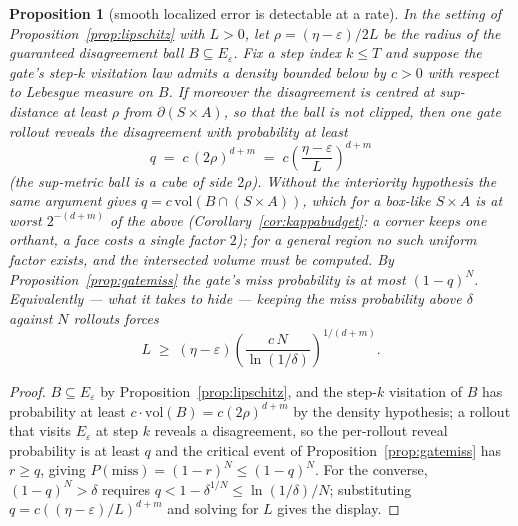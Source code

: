 \documentclass[11pt]{article}
\newtheorem{proposition}{Proposition}
\theoremstyle{definition}
\theoremstyle{remark}
\begin{document}
\begin{proposition}[smooth localized error is detectable at a rate]
\label{prop:detectrate}
In the setting of Proposition~\ref{prop:lipschitz} with $L > 0$, let $\rho = (\eta-\varepsilon)/2L$ be the radius of the guaranteed disagreement ball $B \subseteq E_\varepsilon$. Fix a step index $k \leq T$ and suppose the gate's step-$k$ visitation law admits a density bounded below by $c > 0$ with respect to Lebesgue measure on $B$. If moreover the disagreement is centred at sup-distance at least $\rho$ from $\partial(S \times A)$, so that the ball is not clipped, then one gate rollout reveals the disagreement with probability at least
\[
  q \;=\; c\,(2\rho)^{d+m} \;=\; c\left(\frac{\eta-\varepsilon}{L}\right)^{d+m}
\]
(the sup-metric ball is a cube of side $2\rho$). Without the interiority hypothesis the same argument gives $q = c\,\mathrm{vol}(B \cap (S\times A))$, which for a box-like $S \times A$ is at worst $2^{-(d+m)}$ of the above (Corollary~\ref{cor:kappabudget}: a corner keeps one orthant, a face costs a single factor $2$); for a general region no such uniform factor exists, and the intersected volume must be computed. By Proposition~\ref{prop:gatemiss} the gate's miss probability is at most $(1-q)^N$. Equivalently --- what it takes to \emph{hide} --- keeping the miss probability above $\delta$ against $N$ rollouts forces
\[
  L \;\geq\; (\eta-\varepsilon)\left(\frac{c\,N}{\ln(1/\delta)}\right)^{1/(d+m)} .
\]
\end{proposition}

\begin{proof}
$B \subseteq E_\varepsilon$ by Proposition~\ref{prop:lipschitz}, and the step-$k$ visitation of $B$ has probability at least $c \cdot \mathrm{vol}(B) = c(2\rho)^{d+m}$ by the density hypothesis; a rollout that visits $E_\varepsilon$ at step $k$ reveals a disagreement, so the per-rollout reveal probability is at least $q$ and the critical event of Proposition~\ref{prop:gatemiss} has $r \geq q$, giving $P(\text{miss}) = (1-r)^N \leq (1-q)^N$. For the converse, $(1-q)^N > \delta$ requires $q < 1 - \delta^{1/N} \leq \ln(1/\delta)/N$; substituting $q = c((\eta-\varepsilon)/L)^{d+m}$ and solving for $L$ gives the display.
\end{proof}
\end{document}
